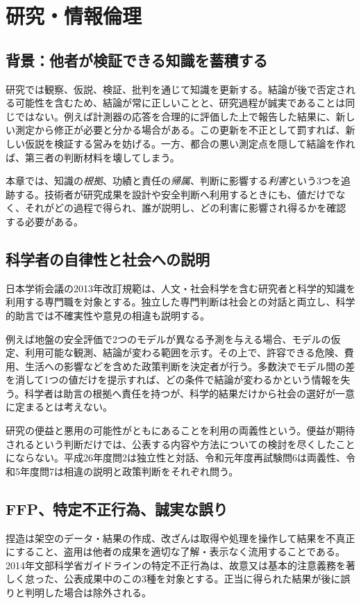 \chapter{研究・情報倫理}
\section{背景：他者が検証できる知識を蓄積する}
研究では観察、仮説、検証、批判を通じて知識を更新する。結論が後で否定される可能性を含むため、結論が常に正しいことと、研究過程が誠実であることは同じではない。例えば計測器の応答を合理的に評価した上で報告した結果に、新しい測定から修正が必要と分かる場合がある。この更新を不正として罰すれば、新しい仮説を検証する営みを妨げる。一方、都合の悪い測定点を隠して結論を作れば、第三者の判断材料を壊してしまう。

本章では、知識の\emph{根拠}、功績と責任の\emph{帰属}、判断に影響する\emph{利害}という3つを追跡する。技術者が研究成果を設計や安全判断へ利用するときにも、値だけでなく、それがどの過程で得られ、誰が説明し、どの利害に影響され得るかを確認する必要がある。

\section{科学者の自律性と社会への説明}
\label{theory:research:norms}
日本学術会議の2013年改訂規範は、人文・社会科学を含む研究者と科学的知識を利用する専門職を対象とする。独立した専門判断は社会との対話と両立し、科学的助言では不確実性や意見の相違も説明する\parencite{scj_code2013}。

例えば地盤の安全評価で2つのモデルが異なる予測を与える場合、モデルの仮定、利用可能な観測、結論が変わる範囲を示す。その上で、許容できる危険、費用、生活への影響などを含めた政策判断を決定者が行う。多数決でモデル間の差を消して1つの値だけを提示すれば、どの条件で結論が変わるかという情報を失う。科学者は助言の根拠へ責任を持つが、科学的結果だけから社会の選好が一意に定まるとは考えない。

研究の便益と悪用の可能性がともにあることを利用の両義性という。便益が期待されるという判断だけでは、公表する内容や方法についての検討を尽くしたことにならない。平成26年度問2は独立性と対話、令和元年度再試験問6は両義性、令和5年度問7は相違の説明と政策判断をそれぞれ問う。

\section{FFP、特定不正行為、誠実な誤り}
\label{theory:research:ffp}
捏造は架空のデータ・結果の作成、改ざんは取得や処理を操作して結果を不真正にすること、盗用は他者の成果を適切な了解・表示なく流用することである。2014年文部科学省ガイドラインの特定不正行為は、故意又は基本的注意義務を著しく怠った、公表成果中のこの3種を対象とする。正当に得られた結果が後に誤りと判明した場合は除外される\parencite{mext_misconduct2014}。

